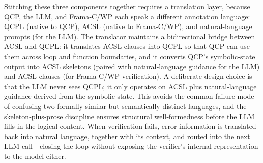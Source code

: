 
\DIFaddbegin
Stitching these three components together requires a translation layer, because QCP, the LLM, and Frama‑C/WP each speak a different annotation language: QCPL (native to QCP), ACSL (native to Frama‑C/WP), and natural-language prompts (for the LLM). The translator maintains a bidirectional bridge between ACSL and QCPL: it translates ACSL clauses into QCPL so that QCP can use them across loop and function boundaries, and it converts QCP’s symbolic‑state output into ACSL skeletons (paired with natural‑language guidance for the LLM) and ACSL clauses (for Frama‑C/WP verification). A deliberate design choice is that the LLM never sees QCPL; it only operates on ACSL plus natural‑language guidance derived from the symbolic state. This avoids the common failure mode of confusing two formally similar but semantically distinct languages, and the skeleton‑plus‑prose discipline ensures structural well‑formedness before the LLM fills in the logical content. When verification fails, error information is translated back into natural language, together with its context, and routed into the next LLM call—closing the loop without exposing the verifier’s internal representation to the model either.
\DIFaddend
